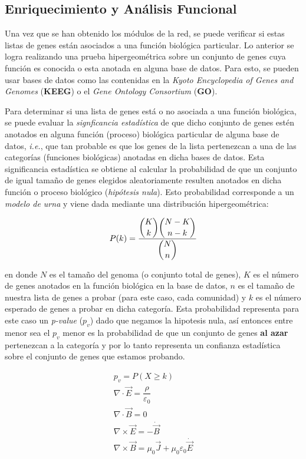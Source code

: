 \documentclass[a4paper,12pt]{article}
\begin{document}
\subsection{Enriquecimiento y Análisis Funcional}

Una vez que se han obtenido los módulos de la red, se puede verificar si estas listas de genes están asociados a una función biológica particular. Lo anterior se logra realizando una prueba hipergeométrica sobre un conjunto de genes cuya función es conocida o esta anotada en alguna base de datos. Para esto, se pueden usar bases de datos como las contenidas en la \emph{Kyoto Encyclopedia of Genes and Genomes} (\textbf{KEEG}) o el \emph{Gene Ontology Consortium} (\textbf{GO}).

Para determinar si una lista de genes está o no asociada a una función biológica, se puede evaluar la \emph{signficancia estadística} de que dicho conjunto de genes estén anotados en alguna función (proceso) biológica particular de alguna base de datos, \emph{i.e.}, que tan probable es que los genes de la lista pertenezcan a una de las categorías (funciones biológicas) anotadas en dicha bases de datos. Esta significancia estadística se obtiene al calcular la probabilidad de que un conjunto de igual tamaño de genes elegidos aleatoriamente resulten anotados en dicha función o proceso biológico (\emph{hipótesis nula}). Esto probabilidad corresponde a un \emph{modelo de urna} y viene dada mediante una distribución hipergeométrica:

\begin{equation*}
  P(k) = \dfrac{\dbinom{K}{k} \dbinom{N-K}{n-k}}{\dbinom{N}{n}}
\end{equation*}

en donde $N$ es el tamaño del genoma (o conjunto total de genes), $K$ es el número de genes anotados en la función biológica en la base de datos, $n$ es el tamaño de nuestra lista de genes a probar (para este caso, cada comunidad) y $k$ es el número esperado de genes a probar en dicha categoría. Esta probabilidad representa para este caso un \emph{p-value} ($p_v$) dado que negamos la hipotesis nula, así entonces entre menor sea el $p_v$ menor es la probabilidad de que un conjunto de genes \textbf{al azar} pertenezcan a la categoría y por lo tanto representa un confianza estadística sobre el conjunto de genes que estamos probando.

\begin{gather*}
  p_v = P({X \geq k}) \\
  \nabla \cdot \vec{E} =  \dfrac{\rho}{\varepsilon_0} \\
  \nabla \cdot \vec{B} = 0 \\
  \nabla \times \vec{E} = -\dot{\vec{B}} \\
  \nabla \times \vec{B} = \mu_0 \vec{J} + \mu_0 \varepsilon_0 \dot{\vec{E}} \\
\end{gather*}
\end{document}
